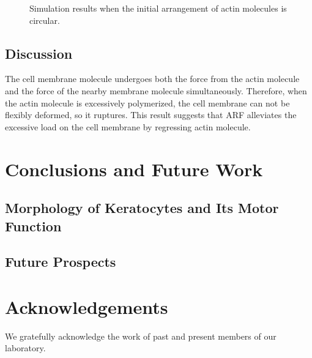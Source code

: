 \documentclass[a4paper,12pt]{book}
\begin{document}
\begin{figure}[h]
{ }%
 \caption{Simulation results when the initial arrangement of actin molecules is circular.}
 \label{fig:res7}
\end{figure}


\section{Discussion}
The cell membrane molecule undergoes both the force from the actin molecule and the force of the nearby membrane molecule simultaneously. Therefore, when the actin molecule is excessively polymerized, the cell membrane can not be flexibly deformed, so it ruptures. This result suggests that ARF alleviates the excessive load on the cell membrane by regressing actin molecule.

\chapter{Conclusions and Future Work}
\section{Morphology of Keratocytes and Its Motor Function}

\section{Future Prospects}

\chapter*{Acknowledgements}
We gratefully acknowledge the work of past and present members of our laboratory.




\end{document}

